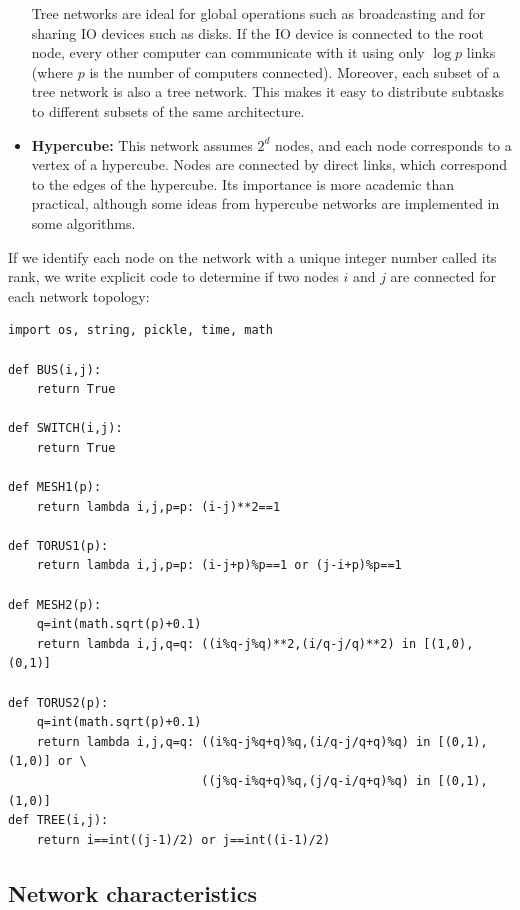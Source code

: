 \documentclass[justified,sixbynine]{tufte-book}
\def\ft{\small\tt}
\theoremstyle{plain}%
\theoremstyle{definition}
\theoremstyle{remark}
\begin{document}
\begin{fullwidth}
\begin{itemize}
Tree networks are ideal for global operations such as broadcasting and for sharing IO devices such as disks. If the IO device is connected to the root node, every other computer can communicate with it using only $\log p$ links (where $p$ is the number of computers connected). Moreover, each subset of a tree network is also a tree network. This makes it easy to distribute subtasks to different subsets of the same architecture.

\item{\bf Hypercube:}
This network assumes $2^d$ nodes, and each node corresponds to a vertex of a hypercube. Nodes are connected by direct links, which correspond to the edges of the hypercube. Its importance is more academic than practical, although some ideas from hypercube networks are implemented in some algorithms.
\end{itemize}

If we identify each node on the network with a unique integer number called its rank, we write explicit code to determine if two nodes $i$ and $j$ are connected for each network topology:


\begin{lstlisting}[caption={in file: {\ft psim.py}}]
import os, string, pickle, time, math

def BUS(i,j):
    return True

def SWITCH(i,j):
    return True

def MESH1(p):
    return lambda i,j,p=p: (i-j)**2==1

def TORUS1(p):
    return lambda i,j,p=p: (i-j+p)%p==1 or (j-i+p)%p==1

def MESH2(p):
    q=int(math.sqrt(p)+0.1)
    return lambda i,j,q=q: ((i%q-j%q)**2,(i/q-j/q)**2) in [(1,0),(0,1)]

def TORUS2(p):
    q=int(math.sqrt(p)+0.1)
    return lambda i,j,q=q: ((i%q-j%q+q)%q,(i/q-j/q+q)%q) in [(0,1),(1,0)] or \
                           ((j%q-i%q+q)%q,(j/q-i/q+q)%q) in [(0,1),(1,0)]
def TREE(i,j):
    return i==int((j-1)/2) or j==int((i-1)/2)
\end{lstlisting}

\goodbreak\subsection{Network characteristics}



\end{fullwidth}
\end{document}
